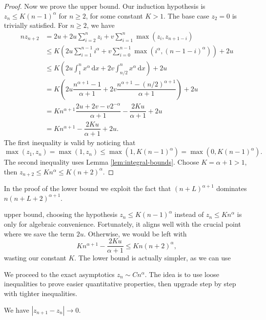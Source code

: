 \begin{proof}
  Now we prove the upper bound. Our induction hypothesis is $z_n \le K (n-1)^\alpha$ for $n\ge 2$, for some constant $K > 1$. The base case $z_2=0$ is trivially satisfied. For $n\ge 2$, we have
  \begin{align*}
    nz_{n+2}
     & = 2u + 2u\sum\limits_{i=2}^n z_i + v\sum\limits_{i=1}^n \max(z_i, z_{n+1-i})                                      \\
     & \le K\left(2u\sum\limits_{i=1}^{n-1} i^\alpha + v\sum\limits_{i=0}^{n-1} \max(i^\alpha, (n-1-i)^\alpha)\right)+2u \\
     & \le K\left(2u\int_1^{n} x^\alpha \, \mathrm{d}x + 2v\int_{n/2}^{n} x^\alpha \, \mathrm{d}x\right) + 2u            \\
     & = K\left(2u\dfrac{n^{\alpha+1} - 1}{\alpha+1} + 2v\dfrac{n^{\alpha+1} - (n/2)^{\alpha+1}}{\alpha+1}\right)+2u     \\
     & = Kn^{\alpha+1}\dfrac{2u+2v - v2^{-\alpha}}{\alpha+1}- \dfrac{2Ku}{\alpha+1}+2u                                   \\
     & = Kn^{\alpha+1} - \dfrac{2Ku}{\alpha+1} + 2u.
  \end{align*}
  The first inequality is valid by noticing that
  $$\max(z_1, z_n) = \max(1, z_n) \le \max(1, K(n-1)^\alpha) = \max(0, K(n-1)^\alpha).$$
  The second inequality uses Lemma \ref{lem:integral-bounds}. Choose $K=\alpha+1 > 1$, then $z_{n+2} \le Kn^\alpha \le K(n+2)^\alpha$.
\end{proof}

\begin{remark}
  In the proof of the lower bound we exploit the fact that $(n+L)^{\alpha+1}$ dominates $n(n+L+2)^{\alpha+1}$.


  upper bound, choosing the hypothesis $z_n \le K(n-1)^\alpha$ instead of $z_n \le Kn^\alpha$ is only for algebraic convenience. Fortunately, it aligns well with the crucial point where we save the term $2u$. Otherwise, we would be left with
  $$Kn^{\alpha+1} - \dfrac{2Ku}{\alpha+1} \le Kn(n+2)^\alpha,$$
  wasting our constant $K$. The lower bound is actually simpler, as we can use
\end{remark}

We proceed to the exact asymptotics $z_n \sim Cn^\alpha$. The idea is to use loose inequalities to prove easier quantitative properties, then upgrade step by step with tighter inequalities.

\begin{lemma}
  \label{lem:vanishing-difference}
  We have $|z_{n+1} - z_n| \to 0$.
\end{lemma}

